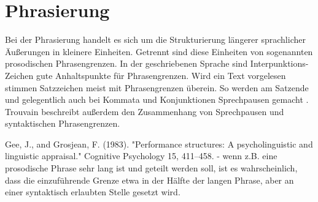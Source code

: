 








\section{Phrasierung}
\label{sec:Phrasierung}

Bei der Phrasierung handelt es sich um die Strukturierung längerer sprachlicher Äußerungen in kleinere Einheiten. Getrennt sind diese Einheiten von sogenannten prosodischen Phrasengrenzen. In der geschriebenen Sprache sind Interpunktions-Zeichen gute Anhaltspunkte für Phrasengrenzen. Wird ein Text vorgelesen stimmen Satzzeichen meist mit Phrasengrenzen überein. So werden am Satzende und gelegentlich auch bei Kommata und Konjunktionen Sprechpausen gemacht \cite{trouvain2018}. Trouvain beschreibt außerdem den Zusammenhang von Sprechpausen und syntaktischen Phrasengrenzen. 


Gee, J., and Grosjean, F. (1983). "Performance structures: A psycholinguistic and linguistic appraisal." Cognitive Psychology 15, 411--458. -  wenn z.B. eine prosodische Phrase sehr lang ist und geteilt werden
soll, ist es wahrscheinlich, dass die einzuführende Grenze etwa in der Hälfte der langen Phrase, aber an einer syntaktisch erlaubten Stelle gesetzt wird. 